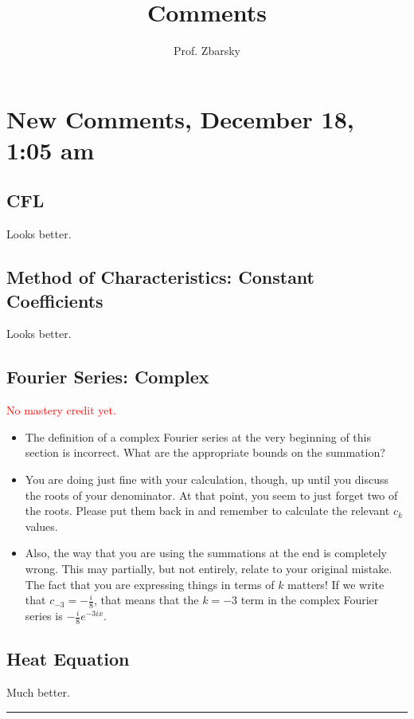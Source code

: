 \documentclass{article}
\def\ds{\displaystyle}
\newcommand{\red}[1]{\textcolor{red}{#1}}
\begin{document}
\title{Comments}
\author{Prof. Zbarsky}
\section{New Comments, December 18, 1:05 am}
\subsection{CFL}
Looks better.

\subsection{Method of Characteristics: Constant Coefficients}
Looks better.
\subsection{Fourier Series: Complex}
\red{No mastery credit yet.} \begin{itemize}
\item The definition of a complex Fourier series at the very beginning of this section is incorrect. What are the appropriate bounds on the summation? 
\item You are doing just fine with your calculation, though, up until you discuss the roots of your denominator. At that point, you seem to just forget two of the roots. Please put them back in and remember to calculate the relevant $c_k$ values. 
\item Also, the way that you are using the summations at the end is completely wrong. This may partially, but not entirely, relate to your original mistake. The fact that you are expressing things in terms of $k$ matters! If we write that $\ds c_{-3} = -\frac{i}{8}$, that means that the $k=-3$ term in the complex Fourier series is $\ds -\frac{i}{8}e^{-3ix}$.
\end{itemize}
\subsection{Heat Equation}
Much better. 

\red{\hrule}
\end{document}
